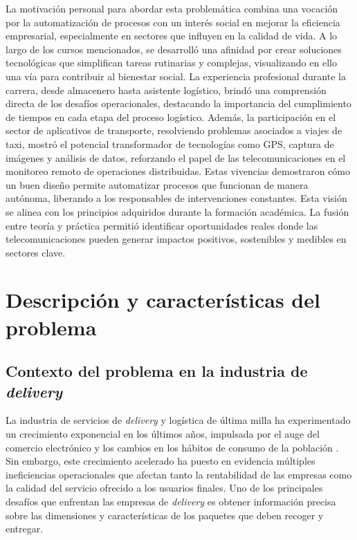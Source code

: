 La motivación personal para abordar esta problemática combina una vocación por la
automatización de procesos con un interés social en mejorar la eficiencia empresarial, especialmente en sectores que influyen en la calidad de vida. A lo largo de los cursos mencionados, se desarrolló una afinidad por crear soluciones tecnológicas que simplifican tareas rutinarias y complejas, visualizando en ello una vía para contribuir al bienestar social.
La experiencia profesional durante la carrera, desde almacenero hasta asistente logístico, brindó una comprensión directa de los desafíos operacionales, destacando la importancia del cumplimiento de tiempos en cada etapa del proceso logístico. Además, la participación en el sector de aplicativos de transporte, resolviendo problemas asociados a viajes de taxi, mostró el potencial transformador de tecnologías como GPS, captura de imágenes y análisis de datos, reforzando el papel de las telecomunicaciones en el monitoreo remoto de operaciones distribuidas.
Estas vivencias demostraron cómo un buen diseño permite automatizar procesos que funcionan de manera autónoma, liberando a los responsables de intervenciones constantes. Esta visión se alinea con los principios adquiridos durante la formación académica. La fusión entre teoría y práctica permitió identificar oportunidades reales donde las telecomunicaciones pueden generar impactos positivos, sostenibles y medibles en sectores clave.
\section{Descripción y características del problema}

\subsection{Contexto del problema en la industria de \textit{delivery}}

La industria de servicios de \textit{delivery} y logística de última milla ha experimentado un crecimiento exponencial en los últimos años, impulsada por el auge del comercio electrónico y los cambios en los hábitos de consumo de la población \cite{RedacciponTLW2025}. Sin embargo, este crecimiento acelerado ha puesto en evidencia múltiples ineficiencias operacionales que afectan tanto la rentabilidad de las empresas como la calidad del servicio ofrecido a los usuarios finales.
Uno de los principales desafíos que enfrentan las empresas de \textit{delivery} es obtener información precisa sobre las dimensiones y características de los paquetes que deben recoger y entregar.

